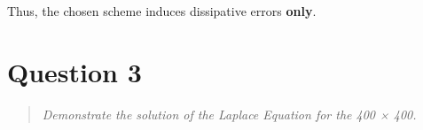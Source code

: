 \documentclass{SelimArticle}
\begin{document}
Thus, the chosen scheme induces dissipative errors \textbf{only}.

\section{Question 3}
\begin{quote}
    \textit{Demonstrate the solution of the Laplace Equation for the 400 × 400.}
\end{quote}
\end{document}
